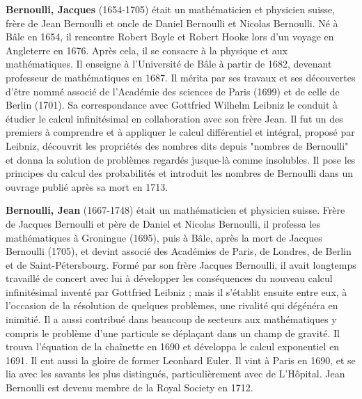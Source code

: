\textbf{Bernoulli, Jacques} (1654-1705) était un mathématicien et physicien suisse, frère de Jean Bernoulli et oncle de Daniel Bernoulli et Nicolas Bernoulli. Né à Bâle en 1654, il rencontre Robert Boyle et Robert Hooke lors d'un voyage en Angleterre en 1676. Après cela, il se consacre à la physique et aux mathématiques. Il enseigne à l'Université de Bâle à partir de 1682, devenant professeur de mathématiques en 1687. Il mérita par ses travaux et ses découvertes d'être nommé associé de l'Académie des sciences de Paris (1699) et de celle de Berlin (1701). Sa correspondance avec Gottfried Wilhelm Leibniz le conduit à étudier le calcul infinitésimal en collaboration avec son frère Jean. Il fut un des premiers à comprendre et à appliquer le calcul différentiel et intégral, proposé par Leibniz, découvrit les propriétés des nombres dits depuis "nombres de Bernoulli" et donna la solution de problèmes regardés jusque-là comme insolubles. Il pose les principes du calcul des probabilités et introduit les nombres de Bernoulli dans un ouvrage publié après sa mort en 1713.

\textbf{Bernoulli, Jean} (1667-1748) était un mathématicien et physicien suisse. Frère de Jacques Bernoulli et père de Daniel et Nicolas Bernoulli, il professa les mathématiques à Groningue (1695), puis à Bâle, après la mort de Jacques Bernoulli (1705), et devint associé des Académies de Paris, de Londres, de Berlin et de Saint-Pétersbourg. Formé par son frère Jacques Bernoulli, il avait longtemps travaillé de concert avec lui à développer les conséquences du nouveau calcul infinitésimal inventé par Gottfried Leibniz ; mais il s'établit ensuite entre eux, à l'occasion de la résolution de quelques problèmes, une rivalité qui dégénéra en inimitié. Il a aussi contribué dans beaucoup de secteurs aux mathématiques y compris le problème d'une particule se déplaçant dans un champ de gravité. Il trouva l'équation de la chaînette en 1690 et développa le calcul exponentiel en 1691. Il eut aussi la gloire de former Leonhard Euler. Il vint à Paris en 1690, et se lia avec les savants les plus distingués, particulièrement avec de L'Hôpital. Jean Bernoulli est devenu membre de la Royal Society en 1712.

